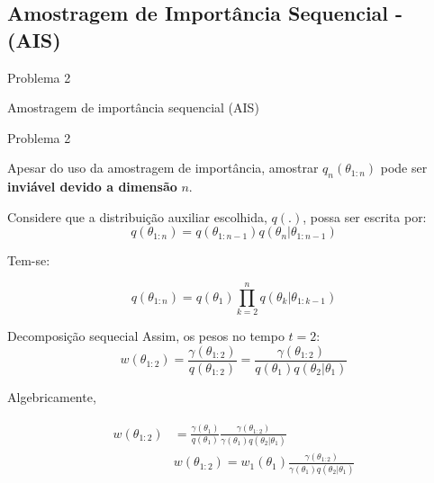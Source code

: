 \documentclass{beamer}
\begin{document}
\subsection{Amostragem de Importância Sequencial - (AIS)}

\begin{frame}{Problema 2}
    \begin{block}{}
      \Huge  Amostragem de importância sequencial (AIS)
    \end{block}
\end{frame}




\begin{frame}{Problema 2}

Apesar do uso da amostragem de importância, amostrar $q_n(\theta_{1:n})$ pode ser \textbf{inviável devido a dimensão} $n$.

\vspace{0.5cm}

\pause

Considere que a distribuição auxiliar escolhida, $q(.)$, possa ser escrita por:
$$ q(\theta_{1:n})  = q(\theta_{1:n-1})q(\theta_n|\theta_{1:n-1})$$

\vspace{0.5cm}

\pause
Tem-se:

$$ q(\theta_{1:n})  = q(\theta_1)\prod_{k=2}^n q(\theta_k|\theta_{1:k-1})$$

\end{frame}





\begin{frame}{Decomposição sequecial}
Assim, os pesos no tempo $t=2$:
$$
w(\theta_{1:2}) =\frac{\gamma(\theta_{1:2})}{q(\theta_{1:2})} = \frac{\gamma(\theta_{1:2})}{q(\theta_1)q(\theta_2|\theta_1)}
$$

\pause

Algebricamente,

\begin{eqnarray} \left. \begin{aligned}
w(\theta_{1:2})  & = \frac{\gamma(\theta_{1})}{q(\theta_{1})}\frac{\gamma(\theta_{1:2})}{\gamma(\theta_1)q(\theta_2|\theta_1)} \\
				 &  w(\theta_{1:2}) = w_1(\theta_1) \frac{\gamma(\theta_{1:2})}{\gamma(\theta_1)q(\theta_2|\theta_1)} \nonumber
\end{aligned}\right. \end{eqnarray}



\end{frame}
\end{document}
